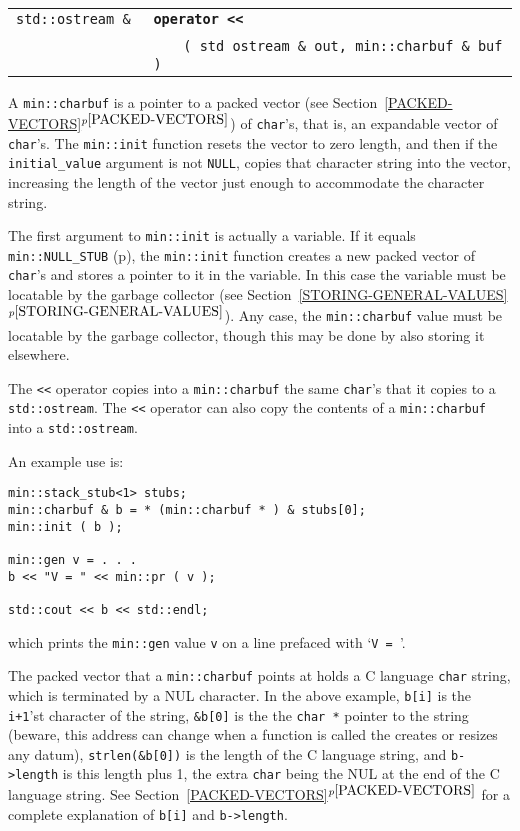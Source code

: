 \documentclass[12pt]{article}
\makeatletter
\newcommand{\ttkey}[1]{{\tt \bf #1}\index{#1@{\tt #1}}}
\newcommand{\itemref}[1]{\ref{#1}$^{p\pageref{#1}}$}
\newcommand{\pagref}[1]{p\pageref{#1}}
\newcommand{\EOL}{\penalty \exhyphenpenalty}
\newcommand{\LT}{{\tt <}}
\newenvironment{indpar}[1][0.3in]%
	{\begin{list}{}%
		     {\setlength{\itemsep}{0in}%
		      \setlength{\topsep}{0in}%
		      \setlength{\parsep}{1ex}%
		      \setlength{\labelwidth}{#1}%
		      \setlength{\leftmargin}{#1}%
		      \addtolength{\leftmargin}{\labelsep}}%
	 \item}%
	{\end{list}}
\newcommand{\LABEL}[1]{\label{#1}}
\newcommand{\TTKEY}[1]{\ttkey{#1}}
\makeatother
\begin{document}
\begin{indpar}[1em]\begin{tabular}{r@{}l}
\verb|std::ostream & |
    & \TTKEY{operator \LT\LT}\\&{\tt ~~}
      \verb| ( std ostream & out, min::charbuf & buf )|
\LABEL{OPERATOR<<_OF_CHARBUF} \\
\end{tabular}\end{indpar}

A {\tt min::charbuf} is a pointer to a packed vector
(see Section~\itemref{PACKED-VECTORS})
of \verb|char|'s, that is, an expandable vector
of \verb|char|'s.
The {\tt min::init} function resets the vector to zero length,
and then if the {\tt initial\_\EOL value} argument is not {\tt NULL},
copies that character string into the vector, increasing the length
of the vector just enough to accommodate the character string.

The first argument to {\tt min::\EOL init} is actually a variable.
If it equals {\tt min::NULL\_\EOL STUB} (\pagref{MIN::NULL_STUB}),
the {\tt min::\EOL init} function
creates a new packed vector of \verb|char|'s and stores
a pointer to it in the variable.
In this case the variable must be locatable by the garbage collector
(see Section~\itemref{STORING-GENERAL-VALUES}).  Any case,
the {\tt min::\EOL charbuf} value must be locatable by the garbage
collector, though this may be done by also storing it elsewhere.

The \verb|<<| operator copies into a {\tt min::charbuf} the same
\verb|char|'s that it copies to a {\tt std::\EOL ostream}.
The \verb|<<| operator can also copy the contents of a {\tt min::\EOL charbuf}
into a {\tt std::\EOL ostream}.


An example use is:
\begin{indpar}\begin{verbatim}
min::stack_stub<1> stubs;
min::charbuf & b = * (min::charbuf * ) & stubs[0];
min::init ( b );

min::gen v = . . .
b << "V = " << min::pr ( v );

std::cout << b << std::endl;
\end{verbatim}\end{indpar}

which prints the \verb|min::gen| value \verb|v| on a line
prefaced with `\verb|V = |'.

The packed vector that a {\tt min::\EOL charbuf} points at
holds a C language \verb|char| string, which is terminated by
a NUL character.  In the above example, \verb|b[i]| is the
\verb|i+1|'st character of the string, \verb|&b[0]| is the
the \verb|char *| pointer to the string (beware, this address
can change when a function is called the creates or resizes
any datum), \verb|strlen(&b[0])|
is the length of the C language string, and
\verb|b->length| is this length plus 1, the extra \verb|char| being
the NUL at the end of the C language string.
See Section~\itemref{PACKED-VECTORS} for a complete explanation of
\verb|b[i]| and \verb|b->length|.
\end{document}
